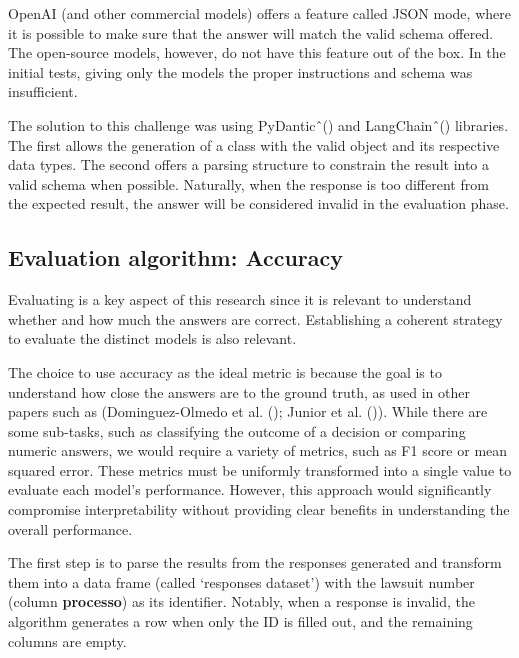 \documentclass[
  12pt,
]{article}
\begin{document}
OpenAI (and other commercial models) offers a feature called JSON mode,
where it is possible to make sure that the answer will match the valid
schema offered. The open-source models, however, do not have this
feature out of the box. In the initial tests, giving only the models the
proper instructions and schema was insufficient.

The solution to this challenge was using
PyDanticˆ() and
LangChainˆ() libraries.
The first allows the generation of a class with the valid object and its
respective data types. The second offers a parsing structure to
constrain the result into a valid schema when possible. Naturally, when
the response is too different from the expected result, the answer will
be considered invalid in the evaluation phase.

\subsection{Evaluation algorithm:
Accuracy}\label{evaluation-algorithm-accuracy}

Evaluating is a key aspect of this research since it is relevant to
understand whether and how much the answers are correct. Establishing a
coherent strategy to evaluate the distinct models is also relevant.

The choice to use accuracy as the ideal metric is because the goal is to
understand how close the answers are to the ground truth, as used in
other papers such as (Dominguez-Olmedo et al.
(); Junior et al.
()). While there are some
sub-tasks, such as classifying the outcome of a decision or comparing
numeric answers, we would require a variety of metrics, such as F1 score
or mean squared error. These metrics must be uniformly transformed into
a single value to evaluate each model's performance. However, this
approach would significantly compromise interpretability without
providing clear benefits in understanding the overall performance.

The first step is to parse the results from the responses generated and
transform them into a data frame (called `responses dataset') with the
lawsuit number (column \textbf{processo}) as its identifier. Notably,
when a response is invalid, the algorithm generates a row when only the
ID is filled out, and the remaining columns are empty.
\end{document}
